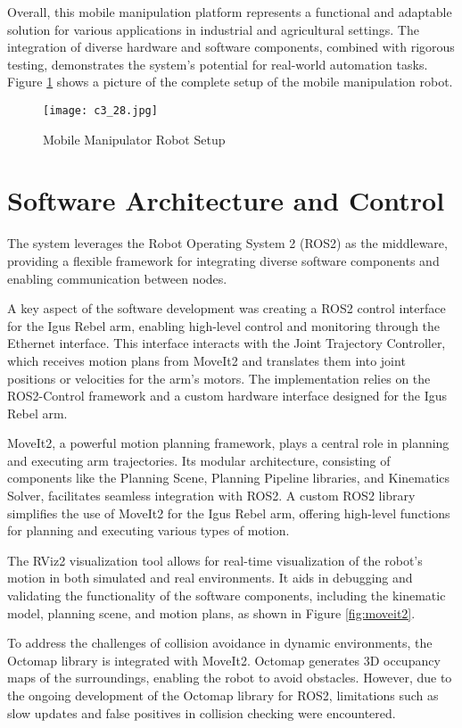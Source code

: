 Overall, this mobile manipulation platform represents a functional and adaptable solution for various applications 
in industrial and agricultural settings. The integration of diverse hardware and software components, combined with
rigorous testing, demonstrates the system's potential for real-world automation tasks.
Figure \ref{fig:setup} shows a picture of the complete setup of the mobile manipulation robot.

\begin{figure}[H]
    \centering
    \texttt{[image: c3\_28.jpg]}
    \caption{Mobile Manipulator Robot Setup}
    \label{fig:setup}
\end{figure}

\section{Software Architecture and Control}

The system leverages the Robot Operating System 2 (ROS2) as the middleware, providing a flexible framework for
integrating diverse software components and enabling communication between nodes.

A key aspect of the software development was creating a ROS2 control interface for the Igus Rebel arm, enabling 
high-level control and monitoring through the Ethernet interface. This interface interacts with the Joint Trajectory 
Controller, which receives motion plans from MoveIt2 and translates them into joint positions or velocities for 
the arm's motors. The implementation relies on the ROS2-Control framework and a custom hardware interface designed
for the Igus Rebel arm.

MoveIt2, a powerful motion planning framework, plays a central role in planning and executing arm trajectories. 
Its modular architecture, consisting of components like the Planning Scene, Planning Pipeline libraries, and 
Kinematics Solver, facilitates seamless integration with ROS2. A custom ROS2 library simplifies the use of 
MoveIt2 for the Igus Rebel arm, offering high-level functions for planning and executing various types of motion.

The RViz2 visualization tool allows for real-time visualization of the robot's motion in both simulated and real 
environments. It aids in debugging and validating the functionality of the software components, including the 
kinematic model, planning scene, and motion plans, as shown in Figure \ref{fig:moveit2}.

To address the challenges of collision avoidance in dynamic environments, the Octomap library is integrated with
MoveIt2. Octomap generates 3D occupancy maps of the surroundings, enabling the robot to avoid obstacles. 
However, due to the ongoing development of the Octomap library for ROS2, limitations such as slow updates and 
false positives in collision checking were encountered.

